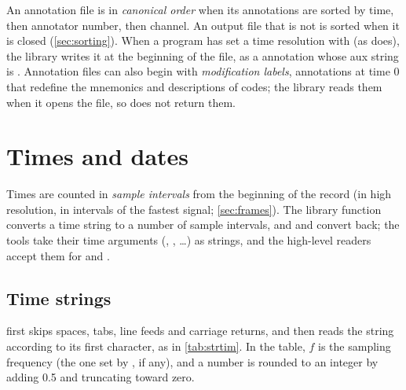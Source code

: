 An annotation file is in \emph{canonical order} when its annotations are
sorted by time, then annotator number, then channel. An output file that is
not is sorted when it is closed (\cref{sec:sorting}). When a program has set
a time resolution with  (as  does), the library
writes it at the beginning of the file, as a  annotation whose
aux string is . Annotation files can also
begin with \emph{modification labels},  annotations at time 0
that redefine the mnemonics and descriptions of codes; the library reads
them when it opens the file, so  does not return them.

\section{Times and dates}
\label{sec:times}

Times are counted in \emph{sample intervals} from the beginning of the
record (in high resolution, in intervals of the fastest signal;
\cref{sec:frames}). The library function  converts a time
string to a number of sample intervals, and  and
 convert back; the tools take their time arguments
(, , \ldots) as  strings, and the high-level
readers accept them for  and .

\subsection{Time strings}

 first skips spaces, tabs, line feeds and carriage returns, and
then reads the string according to its first character, as in
\cref{tab:strtim}. In the table, $f$ is the sampling frequency (the one set
by , if any), and a number is rounded to an integer by adding
0.5 and truncating toward zero.

